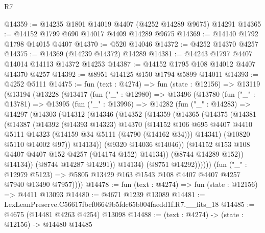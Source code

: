 \begin{lexlean}{R7}
\begin{coremodule}
@14359 := @14235 @1801 @14019 @4407 (@4252 @14289 @9675) @14291
@14365 := @14152 @1799 @690 @14017 @4409 @14289 @9675
@14369 := @14140 @1792 @1798 @14015 @4407
@14370 := @520 @14046
@14372 := @4252 @14370 @4257
@14375 := @14369 (@14239 @14372) @14289
@14381 := @14243 @1797 @4407 @14014 @14113 @14372 @14253
@14387 := @14152 @1795 @108 @14012 @4407 @14370 @4257
@14392 := @8951 @14125 @150 @1794 @5899 @14011
@14393 := @4252 @5111
@14475 := fun (text : @4274) =>
  fun (state : @12156) =>
  @13119
    (@13194
      (@13228
        (@13417
          (fun ("_" : @12980) =>
          @13496
            (@13780
              (fun ("_" : @13781) =>
              @13995
                (fun ("_" : @13996) =>
                @14282
                  (fun ("_" : @14283) =>
                  @14297
                    (@14303
                      (@14312
                        (@14346
                          (@14352
                            (@14359
                              (@14365
                                (@14375
                                  (@14381
                                    (@14387
                                      (@14392
                                        (@14393 @14323)
                                        @14370
                                        (@14152
                                          @106
                                          @695
                                          @4407
                                          @4410
                                          @5111
                                          @14323
                                          (@14159 @34 @5111 (@4790 (@14162 @34)))
                                          @14341)
                                        (@10820 @5110 @14002 @97))
                                      @14134))
                                  (@9320 @14036 @14046))
                                (@14152 @153 @108 @4407 @4407 @152 @4257 (@14174 @152) @14134))
                              (@8744 @14289 @152))
                            @14134))
                        (@8744 @14287 @14291))
                      @14134)
                    (@8751 @14292))))))
          (fun ("_" : @12979 @5123) =>
          @5805 @13429 @163 @1543 @108 @4407 @4407 @4257 @7940 @13490 @7957))))
@14478 := fun (text : @4274) => fun (state : @12156) => @4411 @13093
@14480 := @4671 @1239 @13089
@14481 := LexLeanPreserve.C56617fbcf06649b5fdc65b004faedd1f.R7.__fits_18
@14485 := @4675 (@14481 @4263 @4254) @13098
@14488 := (text : @4274) -> (state : @12156) -> @14480 @14485

\end{coremodule}
\end{lexlean}
